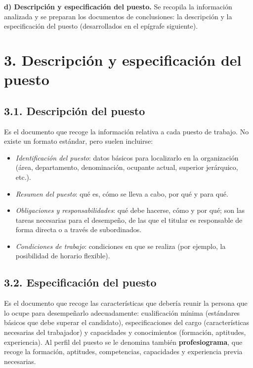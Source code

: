 \documentclass[12pt]{book} %
\providecommand{\tightlist}{%
  \setlength{\itemsep}{0pt}\setlength{\parskip}{0pt}}
\begin{document}
\textbf{d) Descripción y especificación del puesto.} Se recopila la
información analizada y se preparan los documentos de conclusiones: la
descripción y la especificación del puesto (desarrollados en el epígrafe
siguiente).

\hypertarget{descripciuxf3n-y-especificaciuxf3n-del-puesto}{%
\section{3. Descripción y especificación del
puesto}\label{descripciuxf3n-y-especificaciuxf3n-del-puesto}}

\hypertarget{descripciuxf3n-del-puesto}{%
\subsection{3.1. Descripción del
puesto}\label{descripciuxf3n-del-puesto}}

Es el documento que recoge la información relativa a cada puesto de
trabajo. No existe un formato estándar, pero suelen incluirse:

\begin{itemize}
\tightlist
\item
  \emph{Identificación del puesto}: datos básicos para localizarlo en la
  organización (área, departamento, denominación, ocupante actual,
  superior jerárquico, etc.).
\item
  \emph{Resumen del puesto}: qué es, cómo se lleva a cabo, por qué y
  para qué.
\item
  \emph{Obligaciones y responsabilidades}: qué debe hacerse, cómo y por
  qué; son las tareas necesarias para el desempeño, de las que el
  titular es responsable de forma directa o a través de subordinados.
\item
  \emph{Condiciones de trabajo}: condiciones en que se realiza (por
  ejemplo, la posibilidad de horario flexible).
\end{itemize}

\hypertarget{especificaciuxf3n-del-puesto}{%
\subsection{3.2. Especificación del
puesto}\label{especificaciuxf3n-del-puesto}}

Es el documento que recoge las características que debería reunir la
persona que lo ocupe para desempeñarlo adecuadamente: cualificación
mínima (estándares básicos que debe superar el candidato),
especificaciones del cargo (características necesarias del trabajador) y
capacidades y conocimientos (formación, aptitudes, experiencia). Al
perfil del puesto se le denomina también \textbf{profesiograma}, que
recoge la formación, aptitudes, competencias, capacidades y experiencia
previa necesarias.
\end{document}
